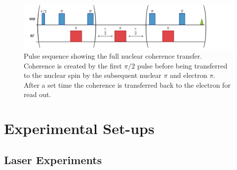 \begin{figure}
\centering
\includegraphics[width=\columnwidth]{Figures/fullcoherencetransfer.pdf}
\caption[Full coherence transfer]{Pulse sequence showing the full nuclear coherence transfer. Coherence is created by the first $\pi/2$ pulse before being transferred to the nuclear spin by the subsequent nuclear $\pi$ and electron $\pi$. After a set time the coherence is transferred back to the electron for read out.}
\label{fig:fullCoher}
\end{figure}

\section{Experimental Set-ups}
\subsection{Laser Experiments}
\label{sec:lasExps}

